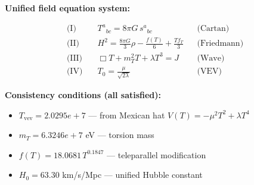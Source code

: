 
\textbf{Unified field equation system:}

\begin{align}
  \text{(I)} \quad & T^a{}_{bc} = 8\pi G \, s^a{}_{bc} && \text{(Cartan)} \\
  \text{(II)} \quad & H^2 = \frac{8\pi G}{3}\rho - \frac{f(T)}{6} + \frac{Tf_T}{3} && \text{(Friedmann)} \\
  \text{(III)} \quad & \Box T + m_T^2 T + \lambda T^3 = J && \text{(Wave)} \\
  \text{(IV)} \quad & T_0 = \frac{\mu}{\sqrt{2\lambda}} && \text{(VEV)}
\end{align}

\textbf{Consistency conditions (all satisfied):}
\begin{itemize}
  \item $T_{\text{vev}} = 2.0295e+7$ — from Mexican hat $V(T) = -\mu^2 T^2 + \lambda T^4$
  \item $m_T = 6.3246e+7$ eV — torsion mass
  \item $f(T) = 18.0681 \, T^{0.1847}$ — teleparallel modification
  \item $H_0 = 63.30$ km/s/Mpc — unified Hubble constant
\end{itemize}